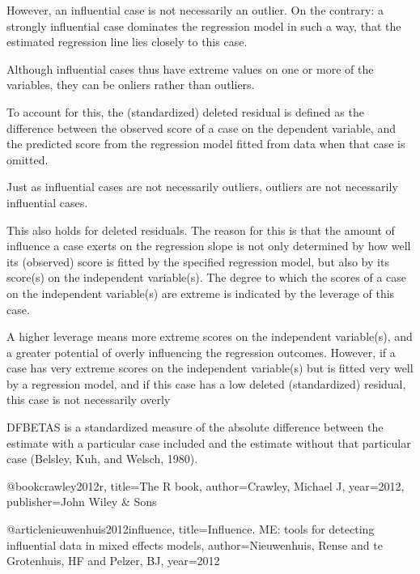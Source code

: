 However, an influential case is not necessarily an outlier. On the contrary: a strongly influential case dominates
the regression model in such a way, that the estimated regression line lies closely to this case. 


Although influential cases thus have extreme values on one or more of the variables, they can be onliers
rather than outliers. 

To account for this, the (standardized) deleted residual is defined as the difference between
the observed score of a case on the dependent variable, and the predicted score from the regression
model fitted from data when that case is omitted.


Just as influential cases are not necessarily outliers, outliers are not necessarily influential cases. 

This also holds for deleted residuals. The reason for this is that the amount of influence a case exerts on the regression slope is not only determined by how well its (observed) score is fitted by the specified
regression model, but also by its score(s) on the independent variable(s). The degree to which the scores of a case on the independent variable(s) are extreme is indicated by the leverage of this case. 

A higher leverage means more extreme scores on the independent variable(s), and a greater potential of
overly influencing the regression outcomes. However, if a case has very extreme scores on the independent
variable(s) but is fitted very well by a regression model, and if this case has a low deleted (standardized)
residual, this case is not necessarily overly

DFBETAS is a standardized measure of the absolute difference between the estimate with a particular
case included and the estimate without that particular case (Belsley, Kuh, and Welsch, 1980).




@book{crawley2012r,
  title={The R book},
  author={Crawley, Michael J},
  year={2012},
  publisher={John Wiley \& Sons}
}

@article{nieuwenhuis2012influence,
  title={Influence. ME: tools for detecting influential data in mixed effects models},
  author={Nieuwenhuis, Rense and te Grotenhuis, HF and Pelzer, BJ},
  year={2012}
}
